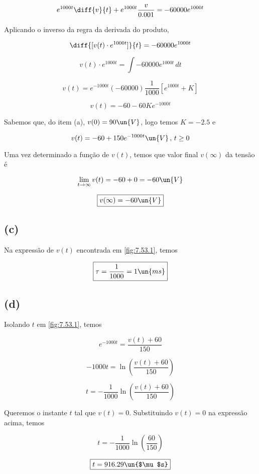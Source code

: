 \[ e^{1000t}\diff{v}{t} + e^{1000t}\frac{v}{0.001} = -60000 e^{1000t} \]

Aplicando o inverso da regra da derivada do produto,

\[ \diff{[v(t) \cdot e^{1000t}]}{t} = -60000 e^{1000t} \]

\[ v(t) \cdot e^{1000t} = \int -60000 e^{1000t} \, dt \]

\[ v(t) = e^{-1000t} (-60000) \frac{1}{1000} [ e^{1000t} + K ] \]

\[ v(t) = - 60 - 60Ke^{-1000t} \]

Sabemos que, do item (a), $v(0) = 90 \un{V}$, logo temos $K = -2.5$ e 

\begin{equation}\label{eq:7.53.1}
    v(t) = - 60 + 150 e^{-1000t} \un{V} \, , \, t \geq 0
\end{equation}

Uma vez determinado a função de $v(t)$, temos que valor final $v(\infty)$ da tensão é    

\[ \displaystyle \lim_{t\to \infty} v(t) = -60 + 0 = - 60 \un{V}  \]

\[ \boxed{v(\infty) = - 60 \un{V}} \]

\subsection*{(c)}

Na expressão de $v(t)$ encontrada em \eqref{fig:7.53.1}, temos 

\[ \boxed{ \tau = \frac{1}{1000} = 1 \un{ms}} \]

\subsection*{(d)}

Isolando $t$ em \eqref{fig:7.53.1}, temos 

\[ e^{-1000t} = \frac{v(t) + 60}{150} \]

\[ -1000t = \ln\left(\frac{v(t) + 60}{150}\right)  \]

\[ t = -\frac{1}{1000} \ln\left(\frac{v(t) + 60}{150}\right)  \]

Queremos o instante $t$ tal que $v(t) = 0$. Substituindo $v(t) = 0$ na expressão acima, temos

\[ t = -\frac{1}{1000} \ln\left(\frac{60}{150}\right)  \]

\[ \boxed{ t = 916.29 \un{$\mu$s}} \]





